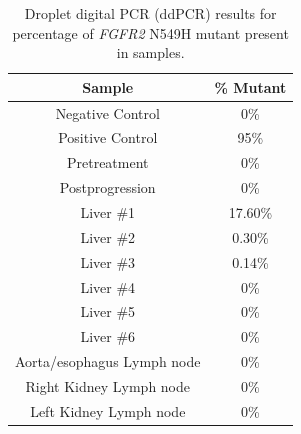\begin{table}[htp]
    \centering
    \begin{tabular}{cc}
        \textbf{Sample} & \textbf{\% Mutant} \\
        \hline
        Negative Control & 0\% \\
        Positive Control & 95\% \\
        Pretreatment & 0\% \\
        Postprogression & 0\% \\
        Liver \#1 & 17.60\% \\
        Liver \#2 & 0.30\% \\
        Liver \#3 & 0.14\% \\
        Liver \#4 & 0\% \\
        Liver \#5 & 0\% \\
        Liver \#6 & 0\% \\
        Aorta/esophagus Lymph node & 0\% \\
        Right Kidney Lymph node & 0\% \\
        Left Kidney Lymph node & 0\%
    \end{tabular}
    \caption[ddPCR for FGFR2 N549H mutation.]{Droplet digital PCR (ddPCR) results for percentage of \textit{FGFR2} N549H mutant present in samples.}
    \label{table:240:ddpcr}
\end{table}
